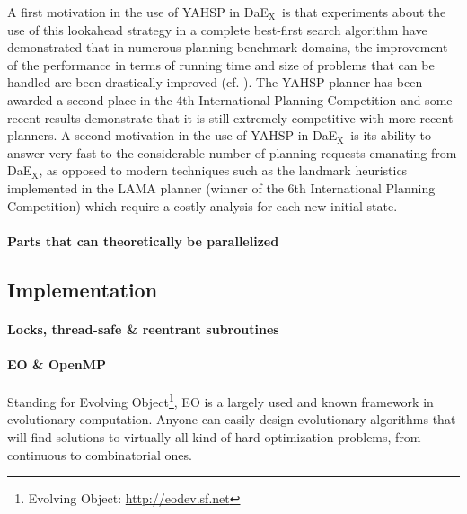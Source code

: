 \documentclass{sig-alternate}
\newcommand{\DAEX}{{\sc DaE$_{\text{X}}$}}
\begin{document}
A first motivation in  the use of YAHSP in \DAEX\ is  that experiments about the
use of  this lookahead strategy in  a complete best-first  search algorithm have
demonstrated that in numerous planning benchmark domains, the improvement of the
performance in  terms of running time and  size of problems that  can be handled
are been  drastically improved (cf. \cite{yahsp:icaps2004}).   The YAHSP planner
has been  awarded a second place  in the 4th  International Planning Competition
\cite{ipc4:jair05} and some  recent results \cite{rintanen:acai2010} demonstrate
that  it is still  extremely competitive  with more  recent planners.   A second
motivation in the use  of YAHSP in \DAEX\ is its ability  to answer very fast to
the considerable number of planning requests emanating from \DAEX, as opposed to
modern  techniques such  as  the  landmark heuristics  implemented  in the  LAMA
planner   \cite{lama:jair2010}  (winner  of   the  6th   International  Planning
Competition) which require a costly analysis for each new initial state.

\paragraph{Parts that can theoretically be parallelized} %

\subsection{Implementation}

\paragraph{Locks, thread-safe \& reentrant subroutines} %

\paragraph{EO \& OpenMP} %


Standing for Evolving Object\footnote{Evolving Object: \url{http://eodev.sf.net}}, EO is a largely used and known framework in evolutionary computation. Anyone can easily design evolutionary algorithms that will find solutions to virtually all kind of hard optimization problems, from continuous to combinatorial ones.
\end{document}
